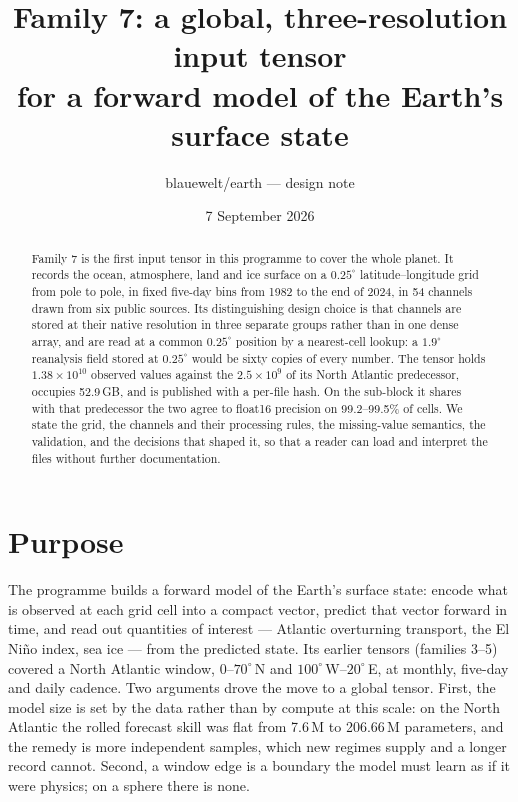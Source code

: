 \documentclass[10pt]{article}
\title{Family 7: a global, three-resolution input tensor\\
\large for a forward model of the Earth's surface state}
\author{blauewelt/earth --- design note}
\date{7 September 2026}
\begin{document}
\maketitle

\begin{abstract}
Family 7 is the first input tensor in this programme to cover the whole
planet. It records the ocean, atmosphere, land and ice surface on a
$0.25^\circ$ latitude--longitude grid from pole to pole, in fixed five-day
bins from 1982 to the end of 2024, in 54 channels drawn from six public
sources. Its distinguishing design choice is that channels are stored at
their native resolution in three separate groups rather than in one dense
array, and are read at a common $0.25^\circ$ position by a nearest-cell
lookup: a $1.9^\circ$ reanalysis field stored at $0.25^\circ$ would be sixty
copies of every number. The tensor holds $1.38\times10^{10}$ observed values
against the $2.5\times10^{9}$ of its North Atlantic predecessor, occupies
52.9\,GB, and is published with a per-file hash. On the sub-block it shares
with that predecessor the two agree to float16 precision on 99.2--99.5\% of
cells. We state the grid, the channels and their processing rules, the
missing-value semantics, the validation, and the decisions that shaped it,
so that a reader can load and interpret the files without further
documentation.
\end{abstract}

\section{Purpose}

The programme builds a forward model of the Earth's surface state: encode
what is observed at each grid cell into a compact vector, predict that vector
forward in time, and read out quantities of interest --- Atlantic
overturning transport, the El Ni\~no index, sea ice --- from the predicted
state. Its earlier tensors (families 3--5) covered a North Atlantic window,
$0$--$70^\circ$\,N and $100^\circ$\,W--$20^\circ$\,E, at monthly, five-day
and daily cadence. Two arguments drove the move to a global tensor. First,
the model size is set by the data rather than by compute at this scale: on
the North Atlantic the rolled forecast skill was flat from 7.6\,M to
206.66\,M parameters, and the remedy is more independent samples, which new
regimes supply and a longer record cannot. Second, a window edge is a
boundary the model must learn as if it were physics; on a sphere there is
none.
\end{document}
